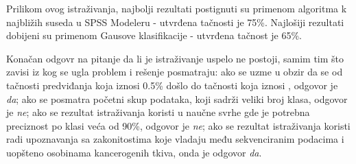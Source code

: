 \documentclass[a4paper]{article}
\begin{document}
Prilikom ovog istraživanja, najbolji rezultati postignuti su primenom algoritma k najbližih suseda u SPSS Modeleru - utvrđena tačnosti je 75\%. Najlošiji rezultati dobijeni su primenom Gausove klasifikacije - utvrđena tačnost je 65\%.

Konačan odgovr na pitanje da li je istraživanje uspelo ne postoji, samim tim što zavisi iz kog se ugla problem i rešenje posmatraju:  ako se uzme u obzir da se od tačnosti predviđanja koja iznosi 0.5\% došlo do tačnosti koja iznosi , odgovor je \textit{da}; ako se posmatra početni skup podataka, koji sadrži veliki broj klasa, odgovor je \textit{ne}; ako se rezultat istraživanja koristi u naučne svrhe gde je potrebna preciznost po klasi veća od 90\%, odgovor je \textit{ne}; ako se rezultat istraživanja koristi radi upoznavanja sa zakonitostima koje vladaju među sekvenciranim podacima i uopšteno osobinama kancerogenih tkiva, onda je odgovor \textit{da}.

\newpage

\appendix
 

\end{document}
